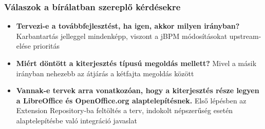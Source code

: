 \documentclass{beamer}
\begin{document}
\begin{frame}
\frametitle{Válaszok a bírálatban szereplő kérdésekre}
\begin{itemize}
\item \textbf{Tervezi-e a továbbfejlesztést, ha igen, akkor milyen irányban?}
Karbantartás jelleggel mindenképp, viszont a jBPM módosításokat upstream-elése
prioritás
\item \textbf{Miért döntött a kiterjesztés típusú megoldás mellett?} Mivel a
másik irányban nehezebb az átjárás a kétfajta megoldás között
\item \textbf{Vannak-e tervek arra vonatkozóan, hogy a kiterjesztés része
legyen a LibreOffice és OpenOffice.org alaptelepítésnek.} Első lépésben az
Extension Repository-ba feltöltés a terv, indokolt népszerűség esetén
alaptelepítésbe való integráció javaslat

\end{itemize}
\end{frame}
\end{document}
